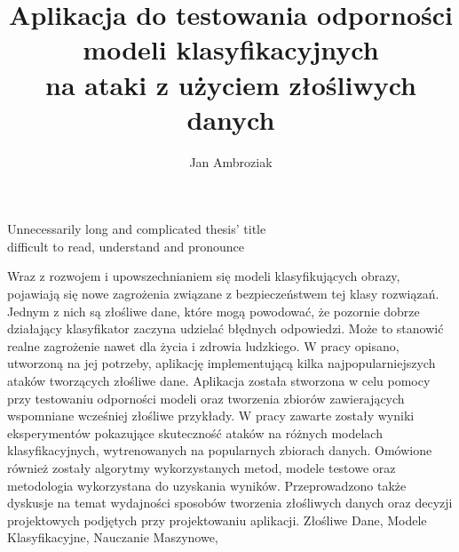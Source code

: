 \documentclass[
    left=2.5cm,         %
    right=2.5cm,        %
    top=2.5cm,          %
    bottom=3cm,         %
    bindingoffset=6mm,  %
    nohyphenation=false %
]{eiti/eiti-thesis}
\begin{document}
\EngineerThesis %
{}
\title
{
    Aplikacja do testowania odporności modeli klasyfikacyjnych \\
    na ataki z użyciem złośliwych danych \\
}

\engtitle
{ %
    Unnecessarily long and complicated thesis' title \\
    difficult to read, understand and pronounce
}

\author{Jan Ambroziak}
\date{\the\year}
\maketitle

\cleardoublepage %
\streszczenie Wraz z rozwojem i upowszechnianiem się modeli klasyfikujących obrazy,
pojawiają się nowe zagrożenia związane z bezpieczeństwem tej klasy rozwiązań.
Jednym z nich są złośliwe dane, które mogą powodować,
że pozornie dobrze działający klasyfikator zaczyna udzielać błędnych odpowiedzi.
Może to stanowić realne zagrożenie nawet dla życia i zdrowia ludzkiego.
W pracy opisano, utworzoną na jej potrzeby, aplikację implementującą kilka najpopularniejszych ataków tworzących złośliwe dane.
Aplikacja została stworzona w celu pomocy przy testowaniu odporności modeli oraz tworzenia zbiorów zawierających wspomniane wcześniej złośliwe przykłady.
W pracy zawarte zostały wyniki eksperymentów pokazujące skuteczność ataków na różnych modelach klasyfikacyjnych, wytrenowanych na popularnych zbiorach danych.
Omówione również zostały algorytmy wykorzystanych metod, modele testowe oraz metodologia wykorzystana do uzyskania wyników.
Przeprowadzono także dyskusje na temat wydajności sposobów tworzenia złośliwych danych oraz decyzji projektowych podjętych przy projektowaniu aplikacji.
\slowakluczowe Złośliwe Dane, Modele Klasyfikacyjne, Nauczanie Maszynowe,
\end{document}

